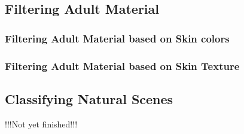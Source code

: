 \documentclass{report}
\begin{document}
\subsection{Filtering Adult Material}
\subsubsection{Filtering Adult Material based on Skin colors}







\subsubsection{Filtering Adult Material based on Skin Texture}






\subsection{Classifying Natural Scenes}









!!!Not yet finished!!!
\end{document}
